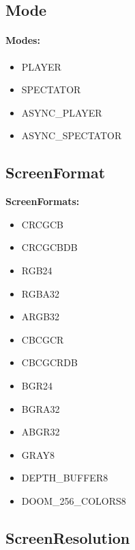 \documentclass[english,bachelor,a4paper,twoside]{ppfcmthesis}
\begin{document}
\subsection{Mode}\label{subsec:mode}

\paragraph{Modes:}

\begin{itemize}
	\item PLAYER
	\item SPECTATOR
	\item ASYNC\_PLAYER 
	\item ASYNC\_SPECTATOR 
\end{itemize}

\subsection{ScreenFormat}\label{subsec:screenformat}


\textbf{ScreenFormats:}
\begin{itemize}
     \item CRCGCB 
     \item CRCGCBDB
     \item RGB24
     \item RGBA32
     \item ARGB32
     \item CBCGCR
     \item CBCGCRDB
     \item BGR24
     \item BGRA32
     \item ABGR32
     \item GRAY8
     \item DEPTH\_BUFFER8
     \item DOOM\_256\_COLORS8
\end{itemize}
\subsection{ScreenResolution} \label{subsec:screenresolution}
\end{document}
